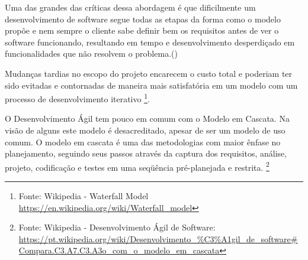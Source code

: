 \par Uma das grandes das críticas dessa abordagem é que dificilmente um desenvolvimento de software segue todas as etapas da forma como o modelo propõe  e nem sempre o cliente sabe definir bem os requisitos antes de ver o software funcionando, resultando em tempo e desenvolvimento desperdiçado em funcionalidades que não resolvem o problema.(\cite{pressman:11})
\par Mudanças tardias no escopo do projeto encarecem o custo total e poderiam ter sido evitadas e contornadas de maneira mais satisfatória em um modelo com um processo de desenvolvimento iterativo \footnote{ Fonte: Wikipedia - Waterfall Model \url {https://en.wikipedia.org/wiki/Waterfall_model}}.
\par O Desenvolvimento Ágil tem pouco em comum com o Modelo em Cascata. Na visão de alguns este modelo é desacreditado, apesar de ser um modelo de uso comum. O modelo em cascata é uma das metodologias com maior ênfase no planejamento, seguindo seus passos através da captura dos requisitos, análise, projeto, codificação e testes em uma seqüência pré-planejada e restrita. \footnote {Fonte: Wikipedia - Desenvolvimento Ágil de Software: \url{https://pt.wikipedia.org/wiki/Desenvolvimento_\%C3\%A1gil_de_software#Compara.C3.A7.C3.A3o_com_o_modelo_em_cascata}}
